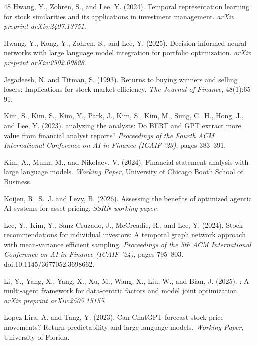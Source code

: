 {\begin{thebibliography}{48}
Hwang, Y., Zohren, S., and Lee, Y. (2024).
\newblock Temporal representation learning for stock similarities and its applications in investment management.
\newblock \emph{arXiv preprint arXiv:2407.13751}.

Hwang, Y., Kong, Y., Zohren, S., and Lee, Y. (2025).
\newblock Decision-informed neural networks with large language model integration for portfolio optimization.
\newblock \emph{arXiv preprint arXiv:2502.00828}.

Jegadeesh, N. and Titman, S. (1993).
\newblock Returns to buying winners and selling losers: Implications for stock market efficiency.
\newblock \emph{The Journal of Finance}, 48(1):65--91.

Kim, S., Kim, S., Kim, Y., Park, J., Kim, S., Kim, M., Sung, C.~H., Hong, J., and Lee, Y. (2023).
 analyzing the analysts: Do {BERT} and {GPT} extract more value from financial analyst reports?
\newblock \emph{Proceedings of the Fourth ACM International Conference on AI in Finance (ICAIF '23)}, pages 383--391.

Kim, A., Muhn, M., and Nikolaev, V. (2024).
\newblock Financial statement analysis with large language models.
\newblock \emph{Working Paper}, University of Chicago Booth School of Business.

Koijen, R.~S.~J. and Levy, B. (2026).
\newblock Assessing the benefits of optimized agentic {AI} systems for asset pricing.
\newblock \emph{SSRN working paper}.

Lee, Y., Kim, Y., Sanz-Cruzado, J., McCreadie, R., and Lee, Y. (2024).
\newblock Stock recommendations for individual investors: A temporal graph network approach with mean-variance efficient sampling.
\newblock \emph{Proceedings of the 5th ACM International Conference on AI in Finance (ICAIF '24)}, pages 795--803. doi:10.1145/3677052.3698662.

Li, Y., Yang, X., Yang, X., Xu, M., Wang, X., Liu, W., and Bian, J. (2025).
: A multi-agent framework for data-centric factors and model joint optimization.
\newblock \emph{arXiv preprint arXiv:2505.15155}.

Lopez-Lira, A. and Tang, Y. (2023).
\newblock Can {ChatGPT} forecast stock price movements? {R}eturn predictability and large language models.
\newblock \emph{Working Paper}, University of Florida.


\end{thebibliography}}
